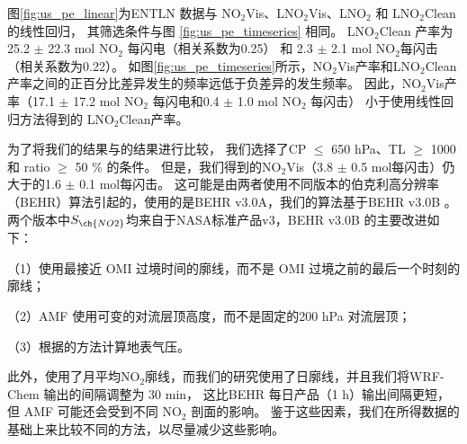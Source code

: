 图\ref{fig:us_pe_linear}为ENTLN 数据与 NO$_2$Vis、LNO$_2$Vis、LNO$_2$ 和 LNO$_2$Clean的线性回归，
其筛选条件与图 \ref{fig:us_pe_timeseries} 相同。
LNO$_2$Clean 产率为 25.2 $\pm$ 22.3 mol NO$_2$ 每闪电（相关系数为0.25）
和 2.3 $\pm$ 2.1 mol NO$_2$每闪击（相关系数为0.22）。
如图\ref{fig:us_pe_timeseries}所示，NO$_2$Vis产率和LNO$_2$Clean产率之间的正百分比差异发生的频率远低于负差异的发生频率。
因此，NO$_2$Vis产率（17.1 $\pm$ 17.2 mol NO$_2$ 每闪电和0.4 $\pm$ 1.0 mol NO$_2$ 每闪击）
小于使用线性回归方法得到的 LNO$_2$Clean产率。

为了将我们的结果与\citet{Lapierre.2020}的结果进行比较，
我们选择了CP $\leq$ 650 hPa、TL $\geq$ 1000 和 ratio $\geq$ 50 \% 的条件。
但是，我们得到的NO$_2$Vis（3.8 $\pm$ 0.5 mol每闪击）仍大于\citet{Lapierre.2020}的1.6 $\pm$ 0.1 mol每闪击。
这可能是由两者使用不同版本的伯克利高分辨率（BEHR）算法引起的，\citet{Lapierre.2020}使用的是BEHR v3.0A，我们的算法基于BEHR v3.0B \citep{Laughner.2019a}。
两个版本中$S_{\ch{NO2}}$均来自于NASA标准产品v3，BEHR v3.0B 的主要改进如下：

（1）使用最接近 OMI 过境时间的廓线，而不是 OMI 过境之前的最后一个时刻的廓线；

（2）AMF 使用可变的对流层顶高度，而不是固定的200 hPa 对流层顶；

（3）根据\citet{Zhou.2009}的方法计算地表气压。

此外，\citet{Lapierre.2020}使用了月平均NO$_2$廓线，而我们的研究使用了日廓线，并且我们将WRF-Chem 输出的间隔调整为 30 min，
这比BEHR 每日产品（1 h）输出间隔更短，但 AMF 可能还会受到不同 NO$_2$ 剖面的影响。
鉴于这些因素，我们在所得数据的基础上来比较不同的方法，以尽量减少这些影响。

